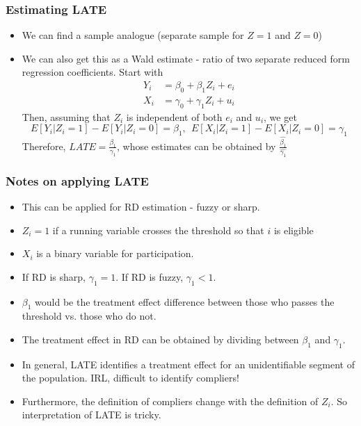 \documentclass[aspectratio=169]{beamer}
\begin{document}
\begin{frame}
\frametitle{Estimating LATE}
\begin{itemize}
\item We can find a sample analogue (separate sample for $Z=1$ and $Z=0$)
\item We can also get this as a Wald estimate - ratio of two separate reduced form regression coefficients. Start with
\[
\begin{aligned}
Y_i &= \beta_0+\beta_1Z_i + e_i\\
X_i & = \gamma_0+\gamma_1Z_i + u_i
\end{aligned}
\]
Then, assuming that $Z_i$ is independent of both $e_i$ and $u_i$, we get
\[
E[Y_i|Z_i=1]-E[Y_i|Z_i=0] = \beta_1, \ \ E[X_i|Z_i=1]-E[X_i|Z_i=0] = \gamma_1
\] 
Therefore, $LATE = \frac{\beta_1}{\gamma_1}$, whose estimates can be obtained by $\frac{\hat{\beta_1}}{\hat{\gamma_1}}$
\end{itemize}
\end{frame}

\begin{frame}
\frametitle{Notes on applying LATE}
\begin{itemize}
\item This can be applied for RD estimation - fuzzy or sharp. 
\item $Z_i=1$ if a running variable crosses the threshold so that $i$ is eligible
\item $X_i$ is a binary variable for participation. 
\item If RD is sharp, $\gamma_1=1$. If RD is fuzzy, $\gamma_1<1$. 
\item $\beta_1$ would be the treatment effect difference between those who passes the threshold vs. those who do not. 
\item The treatment effect in RD can be obtained by dividing between $\beta_1$ and $\gamma_1$. 
\item In general, LATE  identifies a treatment effect for an unidentifiable segment of the population. IRL, difficult to identify compliers! 
\item Furthermore, the definition of compliers change with the definition of $Z_i$. So interpretation of LATE is tricky.
\end{itemize}
\end{frame}
\end{document}
